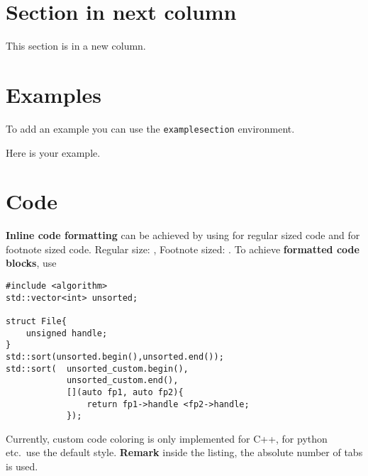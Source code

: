 \documentclass[\fontheight]{extarticle}
\begin{document}
\begin{multicols*}{3}
    \newcol{}

    \section{Section in next column}
    This section is in a new column.

    \section{Examples}
    To add an example you can use the \texttt{examplesection} environment.
    \begin{examplesection}
        Here is your example.
    \end{examplesection}

    \section{Code}
    \textbf{Inline code formatting} can be achieved by using  for regular sized code
    and  for footnote sized code.\newline
    Regular size: ,\newline
    Footnote sized: .
    \newpar{}
    To achieve \textbf{formatted code blocks}, use \newline

    \begin{lstlisting}[style=bright_C++]
#include <algorithm>
std::vector<int> unsorted;

struct File{
    unsigned handle;
}
std::sort(unsorted.begin(),unsorted.end());
std::sort(  unsorted_custom.begin(),
            unsorted_custom.end(),
            [](auto fp1, auto fp2){
                return fp1->handle <fp2->handle;
            });
\end{lstlisting}

    Currently, custom code coloring is only implemented for C++, for python etc.\ use the default style.
    \newpar{}
    \textbf{Remark} inside the listing, the absolute number of tabs is used.


\end{multicols*}
\end{document}
